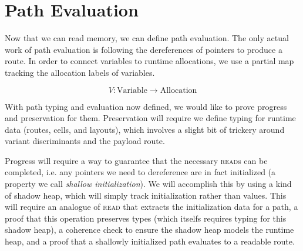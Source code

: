 \section*{Path Evaluation}

Now that we can read memory, we can define path evaluation.
The only actual work of path evaluation is following the dereferences of pointers
to produce a route. In order to connect variables to runtime allocations, we use
a partial map tracking the allocation labels of variables.

$$ V : \mathrm{Variable} \to \mathrm{Allocation} $$



With path typing and evaluation now defined, we would like to prove progress
and preservation for them. Preservation will require we define typing for
runtime data (routes, cells, and layouts), which involves a slight bit of trickery
around variant discriminants and the payload route.

Progress will require a way to guarantee that the necessary \textsc{read}s 
can be completed, i.e. any pointers we need to dereference are in fact initialized
(a property we call \emph{shallow initialization}).
We will accomplish this by using a kind of shadow heap, which will simply track
initialization rather than values.
This will require an analogue of \textsc{read} that extracts the initialization
data for a path, a proof that this operation preserves types 
(which itselfs requires typing for this shadow heap),
a coherence check to ensure the shadow heap models the runtime heap,
and a proof that a shallowly initialized path evaluates to a readable route.
